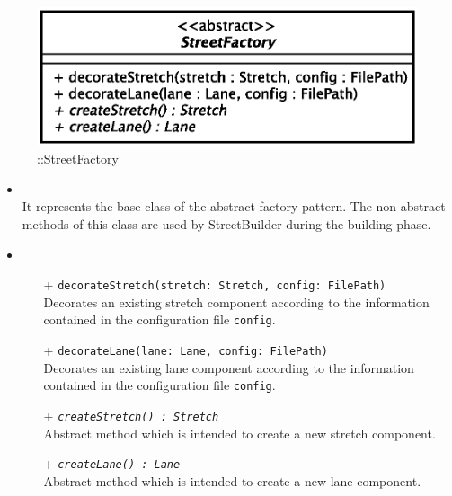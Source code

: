 \begin{figure}[h]
\centering
\includegraphics[scale=0.6,keepaspectratio]{images/solution/app/backend/street_factory.eps}
\caption{\pReactiveFactory::StreetFactory}
\label{fig:sd-app-street-factory}
\end{figure}
\FloatBarrier
\begin{itemize}
  \item \textbf{\descr} \\
    It represents the base class of the abstract factory pattern. The 
non-abstract methods of this class are used by StreetBuilder during the
building phase.
  \item \textbf{\ops} \\
  \begin{itemize} 
    \item[+] \texttt{decorateStretch(stretch: Stretch, config: FilePath)} \\
Decorates an existing stretch component according to the information contained
in the configuration file \texttt{config}.
    \item[+] \texttt{decorateLane(lane: Lane, config: FilePath)} \\
Decorates an existing lane component according to the information contained in
the configuration file \texttt{config}.
    \item[+] \texttt{\textit{createStretch() : Stretch}} \\
Abstract method which is intended to create a new stretch component.
    \item[+] \texttt{\textit{createLane() : Lane}} \\
Abstract method which is intended to create a new lane component.
  \end{itemize}
\end{itemize}
